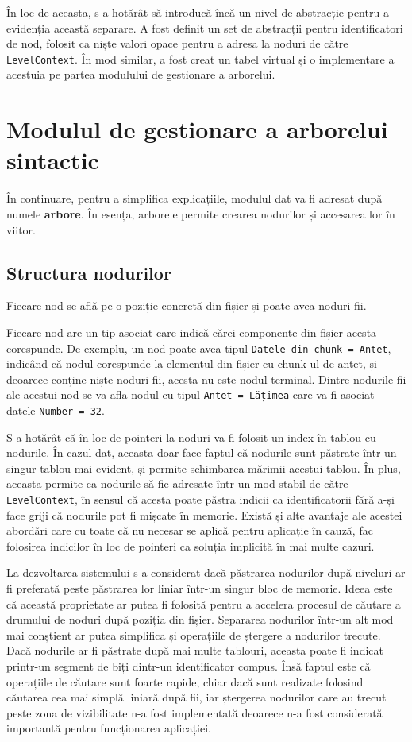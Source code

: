 \documentclass[a4paper,12pt]{report}
\begin{document}
În loc de aceasta, s-a hotărât să introducă încă un nivel de abstracție pentru a evidenția această separare.
A fost definit un set de abstracții pentru identificatori de nod,
folosit ca niște valori opace pentru a adresa la noduri de către \texttt{LevelContext}.
În mod similar, a fost creat un tabel virtual și o implementare a acestuia pe partea modulului de gestionare a arborelui.

\section{Modulul de gestionare a arborelui sintactic}

În continuare, pentru a simplifica explicațiile, modulul dat va fi adresat după numele \textbf{arbore}.
În esența, arborele permite crearea nodurilor și accesarea lor în viitor.

\subsection{Structura nodurilor}

Fiecare nod se află pe o poziție concretă din fișier și poate avea noduri fii.

Fiecare nod are un tip asociat care indică cărei componente din fișier acesta corespunde.
De exemplu, un nod poate avea tipul \texttt{Datele din chunk = Antet},
indicând că nodul corespunde la elementul din fișier cu chunk-ul de antet,
și deoarece conține niște noduri fii, acesta nu este nodul terminal.
Dintre nodurile fii ale acestui nod se va afla nodul cu tipul \texttt{Antet = Lățimea}
care va fi asociat datele \texttt{Number = 32}.

S-a hotărât că în loc de pointeri la noduri va fi folosit un index în tablou cu nodurile.
În cazul dat, aceasta doar face faptul că nodurile sunt păstrate într-un singur tablou mai evident,
și permite schimbarea mărimii acestui tablou.
În plus, aceasta permite ca nodurile să fie adresate într-un mod stabil de către \texttt{LevelContext},
în sensul că acesta poate păstra indicii ca identificatorii fără a-și face griji că nodurile pot fi mișcate în memorie.
Există și alte avantaje ale acestei abordări care cu toate că nu necesar se aplică pentru aplicație în cauză,
fac folosirea indicilor în loc de pointeri ca soluția implicită în mai multe cazuri.

La dezvoltarea sistemului s-a considerat dacă păstrarea nodurilor după niveluri ar fi preferată
peste păstrarea lor liniar într-un singur bloc de memorie.
Ideea este că această proprietate ar putea fi folosită pentru a accelera procesul de căutare
a drumului de noduri după poziția din fișier.
Separarea nodurilor într-un alt mod mai conștient ar putea simplifica
și operațiile de ștergere a nodurilor trecute.
Dacă nodurile ar fi păstrate după mai multe tablouri,
aceasta poate fi indicat printr-un segment de biți dintr-un identificator compus.
Însă faptul este că operațiile de căutare sunt foarte rapide,
chiar dacă sunt realizate folosind căutarea cea mai simplă liniară după fii,
iar ștergerea nodurilor care au trecut peste zona de vizibilitate
n-a fost implementată deoarece n-a fost considerată importantă pentru funcționarea aplicației.
\end{document}
